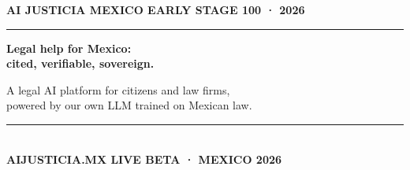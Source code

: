 \documentclass[aspectratio=169,11pt]{beamer}
\begin{document}
\begingroup
{}
\begin{frame}[plain]
  \vspace{0.2cm}
  {\color{mint}\footnotesize\bfseries AI JUSTICIA \hfill \textnormal{\color{muted}MEXICO EARLY STAGE 100 · 2026}}\\[2pt]
  {\color{emeralddeep}\rule{\textwidth}{0.8pt}}

  \vfill
  {\fontsize{31}{37}\selectfont\bfseries\color{white}Legal help for Mexico:\\[3pt]
   \fontsize{31}{37}\selectfont\bfseries\color{mint}cited, verifiable, sovereign.}
   \vspace{9pt}

  {\large\color{white!75!bgdark}A legal AI platform for citizens and law firms,\\ powered by our own LLM trained on Mexican law.}
  \vfill

  {\color{emeralddeep}\rule{\textwidth}{0.8pt}}\\[3pt]
  {\tiny\bfseries\color{muted}AIJUSTICIA.MX \hfill LIVE BETA · MEXICO \hfill 2026}
\end{frame}
\endgroup
\end{document}
